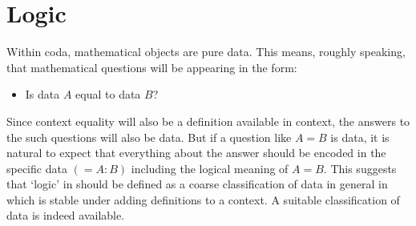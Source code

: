 \documentclass[11pt]{article}
\begin{document}
\section{Logic}

Within coda, mathematical objects are pure data.  This means, roughly speaking, that mathematical questions will be appearing in the form:
\begin{itemize}
\item[] Is data $A$ equal to data $B$?
\end{itemize}
Since context equality will also be a definition available in context, the answers to the such questions will also be data.
But if a question like $A=B$ is data, it is natural to expect that everything about the answer should be encoded in the
specific data $(= A:B)$ including the logical meaning of $A=B$.
This suggests that `logic' in should be defined as a coarse classification
of data in general in which is stable under adding definitions to a context.  A suitable classification of data is indeed available.
\end{document}

